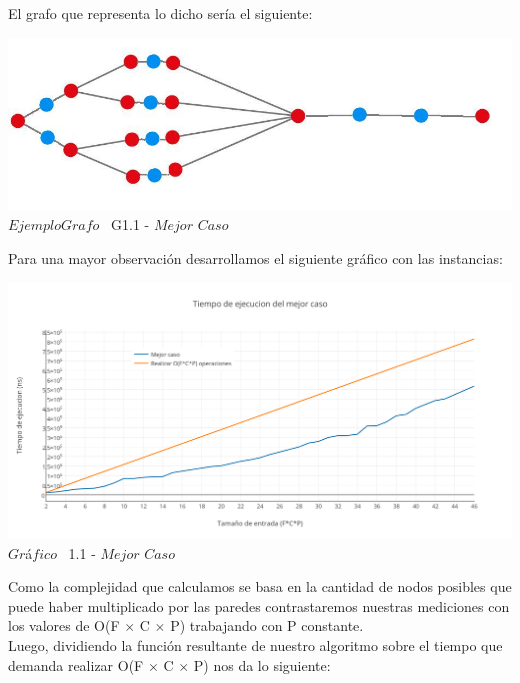 El grafo que representa lo dicho ser\'ia el siguiente:\\

\vspace*{0.3cm} \vspace*{0.3cm}
  \begin{center}
\includegraphics[scale=0.65]{./EJ1/ej1grafomejorcaso.jpeg}
{$Ejemplo Grafo$ \ G1.1 - $Mejor$ $Caso$}
  \end{center}
  \vspace*{0.3cm}


Para una mayor observaci\'on desarrollamos el siguiente gr\'afico con las instancias:\\

\vspace*{0.3cm} \vspace*{0.3cm}
  \begin{center}
 \includegraphics[scale=0.4]{./EJ1/mejorcaso.png}
 {$Gr$\'a$fico$ \ 1.1 - $Mejor$ $Caso$}
  \end{center}
  \vspace*{0.3cm}

Como la complejidad que calculamos se basa en la cantidad de nodos posibles que puede haber multiplicado por las paredes contrastaremos nuestras mediciones con los valores de O(F $\times$ C $\times$ P) trabajando con P constante.\\

Luego, dividiendo la funci\'on resultante de nuestro algoritmo sobre el tiempo que demanda realizar O(F $\times$ C $\times$ P) nos da lo siguiente:

